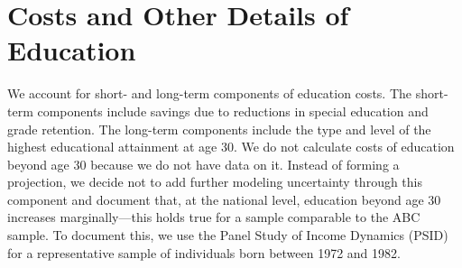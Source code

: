 \section{Costs and Other Details of Education} \label{appendix:education}

\noindent We account for short- and long-term components of education costs. The short-term components include savings due to reductions in special education and grade retention. The long-term components include the type and level of the highest educational attainment at age 30. We do not calculate costs of education beyond age 30 because we do not have data on it. Instead of forming a projection, we decide not to add further modeling uncertainty through this component and document that, at the national level, education beyond age 30 increases marginally---this holds true for a sample comparable to the ABC sample. To document this, we use the  Panel Study of Income Dynamics (PSID) for a representative sample of individuals born between 1972 and 1982. \\

